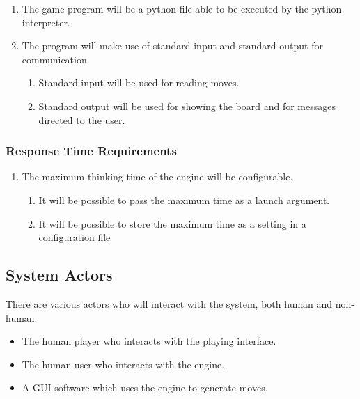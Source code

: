 \begin{enumerate}

	\item The game program will be a python file able to be executed by the
		python interpreter.

	\item The program will make use of standard input and standard output for
		communication.
		\begin{enumerate}
			\item Standard input will be used for reading moves.
			\item Standard output will be used for showing the board and for
				messages directed to the user.
		\end{enumerate}

\end{enumerate}

\subsubsection{Response Time Requirements}


\begin{enumerate}

	\item The maximum thinking time of the engine will be configurable.
		\begin{enumerate}
			\item It will be possible to pass the maximum time as a launch
				argument.
			\item It will be possible to store the maximum time as a setting
				in a configuration file
		\end{enumerate}

\end{enumerate}



\subsection{System Actors}

There are various actors who will interact with the system, both human and
non-human.

\begin{itemize}

	\item The human player who interacts with the playing interface.
	\item The human user who interacts with the engine.
	\item A GUI software which uses the engine to generate moves.

\end{itemize}

